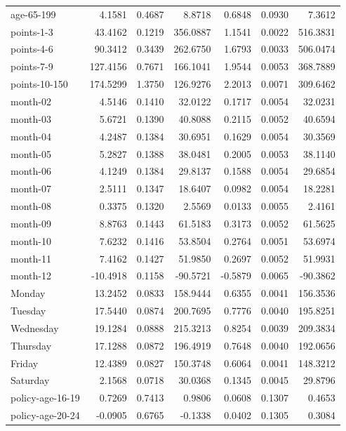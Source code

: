 \documentclass[10pt]{article}
\begin{document}
\begin{table}[ht]
\begin{tabular}{lrrrrrr}
  age-65-199 & 4.1581 & 0.4687 & 8.8718 & 0.6848 & 0.0930 & 7.3612 \\ 
  points-1-3 & 43.4162 & 0.1219 & 356.0887 & 1.1541 & 0.0022 & 516.3831 \\ 
  points-4-6 & 90.3412 & 0.3439 & 262.6750 & 1.6793 & 0.0033 & 506.0474 \\ 
  points-7-9 & 127.4156 & 0.7671 & 166.1041 & 1.9544 & 0.0053 & 368.7889 \\ 
  points-10-150 & 174.5299 & 1.3750 & 126.9276 & 2.2013 & 0.0071 & 309.6462 \\ 
  month-02 & 4.5146 & 0.1410 & 32.0122 & 0.1717 & 0.0054 & 32.0231 \\ 
  month-03 & 5.6721 & 0.1390 & 40.8088 & 0.2115 & 0.0052 & 40.6594 \\ 
  month-04 & 4.2487 & 0.1384 & 30.6951 & 0.1629 & 0.0054 & 30.3569 \\ 
  month-05 & 5.2827 & 0.1388 & 38.0481 & 0.2005 & 0.0053 & 38.1140 \\ 
  month-06 & 4.1249 & 0.1384 & 29.8137 & 0.1588 & 0.0054 & 29.6854 \\ 
  month-07 & 2.5111 & 0.1347 & 18.6407 & 0.0982 & 0.0054 & 18.2281 \\ 
  month-08 & 0.3375 & 0.1320 & 2.5569 & 0.0133 & 0.0055 & 2.4161 \\ 
  month-09 & 8.8763 & 0.1443 & 61.5183 & 0.3173 & 0.0052 & 61.5625 \\ 
  month-10 & 7.6232 & 0.1416 & 53.8504 & 0.2764 & 0.0051 & 53.6974 \\ 
  month-11 & 7.4162 & 0.1427 & 51.9850 & 0.2697 & 0.0052 & 51.9931 \\ 
  month-12 & -10.4918 & 0.1158 & -90.5721 & -0.5879 & 0.0065 & -90.3862 \\ 
  Monday & 13.2452 & 0.0833 & 158.9444 & 0.6355 & 0.0041 & 156.3536 \\ 
  Tuesday & 17.5440 & 0.0874 & 200.7695 & 0.7776 & 0.0040 & 195.8251 \\ 
  Wednesday & 19.1284 & 0.0888 & 215.3213 & 0.8254 & 0.0039 & 209.3834 \\ 
  Thursday & 17.1288 & 0.0872 & 196.4919 & 0.7648 & 0.0040 & 192.0656 \\ 
  Friday & 12.4389 & 0.0827 & 150.3748 & 0.6064 & 0.0041 & 148.3212 \\ 
  Saturday & 2.1568 & 0.0718 & 30.0368 & 0.1345 & 0.0045 & 29.8796 \\ 
  policy-age-16-19 & 0.7269 & 0.7413 & 0.9806 & 0.0608 & 0.1307 & 0.4653 \\ 
  policy-age-20-24 & -0.0905 & 0.6765 & -0.1338 & 0.0402 & 0.1305 & 0.3084 \\ 

\end{tabular}
\end{table}
\end{document}
